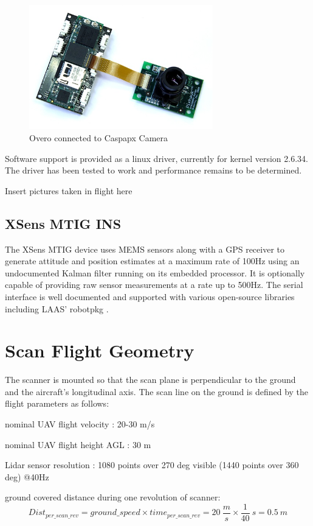 \documentclass[a4paper,11pt]{report}
\begin{document}
\begin{figure}[ht]
 \centering
 \includegraphics[width=8cm]{overo_and_caspa.jpeg}
 \caption{Overo connected to Caspapx Camera}
 \label{fig:caspa}
\end{figure}

Software support is provided as a linux driver, currently for kernel version 2.6.34. The driver has been tested to work and performance remains to be determined.

Insert pictures taken in flight here

\subsection{XSens MTIG INS}
\label{MTIG}

The XSens MTIG device uses MEMS sensors along with a GPS receiver to generate attitude and position estimates at a maximum rate of 100Hz using an undocumented Kalman filter running on its embedded processor. It is optionally capable of providing raw sensor measurements at a rate up to 500Hz. The serial interface is well documented and supported with various open-source libraries including LAAS' robotpkg \cite{robotpkg}.


\section{Scan Flight Geometry}
\label{geometry}

The scanner is mounted so that the scan plane is perpendicular to the ground and the aircraft's longitudinal axis. The scan line on the ground is defined by the flight parameters as follows:

nominal UAV flight velocity : 20-30 m/s

nominal UAV flight height AGL : 30 m

Lidar sensor resolution : 1080 points over 270 deg visible (1440 points over 360 deg) @40Hz

ground covered distance during one revolution of scanner:
\begin{equation}
Dist_{per\_scan\_rev} = ground\_speed \times time_{per\_scan\_rev} = 20~\frac{m}{s} \times \frac{1}{40}~s = 0.5~m 
\end{equation}
\end{document}
